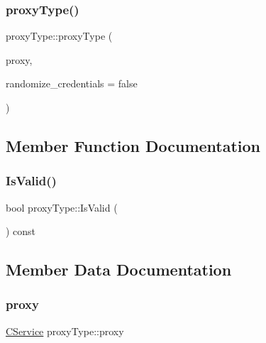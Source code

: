 \mbox{\label{classproxy_type_ab628e8a0b5e97f2c9f43d24d341600da}} 
\subsubsection{\texorpdfstring{proxy\+Type()}{proxyType()}\hspace{0.1cm}{\footnotesize\ttfamily [2/2]}}
{\footnotesize\ttfamily proxy\+Type\+::proxy\+Type (\begin{DoxyParamCaption}\item[{const \mbox{\hyperlink{class_c_service}{C\+Service}} \&}]{proxy,  }\item[{bool}]{randomize\+\_\+credentials = {\ttfamily false} }\end{DoxyParamCaption})\hspace{0.3cm}{\ttfamily [inline]}}



\subsection{Member Function Documentation}
\mbox{\label{classproxy_type_a3f3c9c016b103c8ff5e61d115c188b36}} 
\subsubsection{\texorpdfstring{Is\+Valid()}{IsValid()}}
{\footnotesize\ttfamily bool proxy\+Type\+::\+Is\+Valid (\begin{DoxyParamCaption}{ }\end{DoxyParamCaption}) const\hspace{0.3cm}{\ttfamily [inline]}}



\subsection{Member Data Documentation}
\mbox{\label{classproxy_type_a5bd2641d60e071671cbfe4f45e831743}} 
\subsubsection{\texorpdfstring{proxy}{proxy}}
{\footnotesize\ttfamily \mbox{\hyperlink{class_c_service}{C\+Service}} proxy\+Type\+::proxy}

